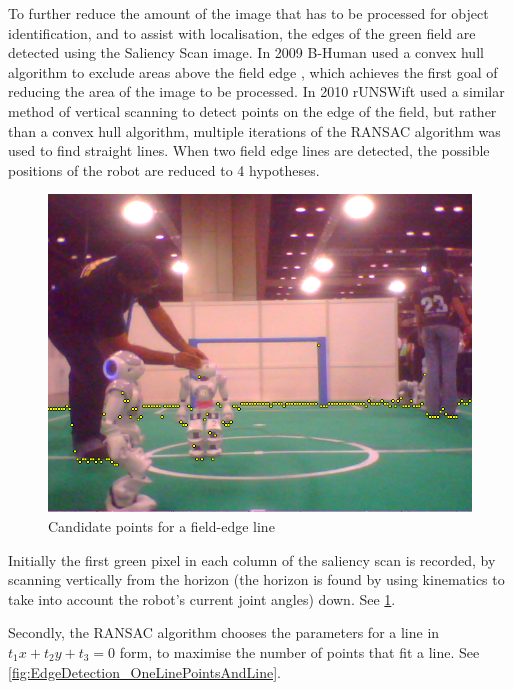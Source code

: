 \documentclass[runningheads,a4paper]{llncs}
\begin{document}
To further reduce the amount of the image that has to be processed for object identification, and to assist with localisation, the edges of the green field are detected using the Saliency Scan image. In 2009 B-Human used a convex hull algorithm to exclude areas above the field edge \cite{thomas09code}, which achieves the first goal of reducing the area of the image to be processed. In 2010 rUNSWift used a similar method of vertical scanning to detect points on the edge of the field, but rather than a convex hull algorithm, multiple iterations of the RANSAC algorithm was used to find straight lines. When two field edge lines are detected, the possible positions of the robot are reduced to 4 hypotheses.

\begin{figure}
\centering
\includegraphics[width=1.0\textwidth]{figures/EdgeDetection_OneLinePoints}
\caption{Candidate points for a field-edge line} \label{fig:EdgeDetection_OneLinePoints}
\end{figure}

Initially the first green pixel in each column of the saliency scan is recorded, by scanning vertically from the horizon (the horizon is found by using kinematics to take into account the robot's current joint angles) down. See \ref{fig:EdgeDetection_OneLinePoints}.

Secondly, the RANSAC algorithm chooses the parameters for a line in $t_1x + t_2y + t_3 = 0$ form, to maximise the number of points that fit a line. See \ref{fig:EdgeDetection_OneLinePointsAndLine}.
\end{document}
